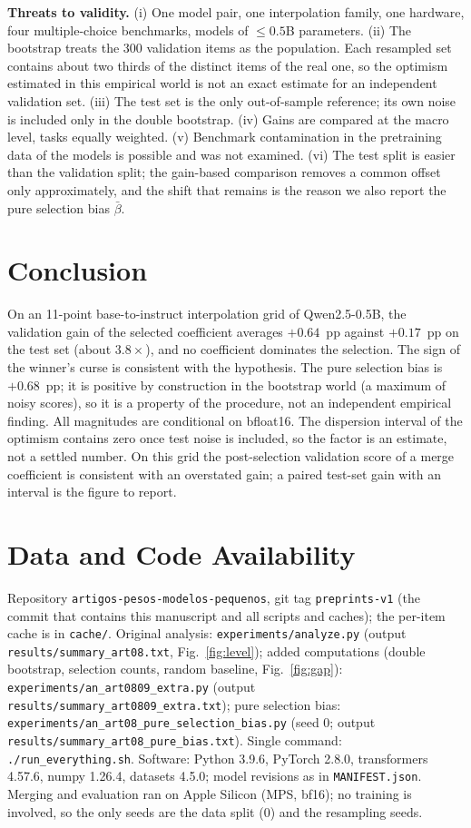 \documentclass[conference]{IEEEtran}
\begin{document}
\textbf{Threats to validity.} (i) One model pair, one interpolation family, one hardware, four multiple-choice benchmarks, models of $\le0.5$B parameters. (ii) The bootstrap treats the 300 validation items as the population. Each resampled set contains about two thirds of the distinct items of the real one, so the optimism estimated in this empirical world is not an exact estimate for an independent validation set. (iii) The test set is the only out-of-sample reference; its own noise is included only in the double bootstrap. (iv) Gains are compared at the macro level, tasks equally weighted. (v) Benchmark contamination in the pretraining data of the models is possible and was not examined. (vi) The test split is easier than the validation split; the gain-based comparison removes a common offset only approximately, and the shift that remains is the reason we also report the pure selection bias $\bar\beta$.

\section{Conclusion}
On an 11-point base-to-instruct interpolation grid of Qwen2.5-0.5B, the validation gain of the selected coefficient averages $+0.64$~pp against $+0.17$~pp on the test set (about $3.8\times$), and no coefficient dominates the selection. The sign of the winner's curse is consistent with the hypothesis. The pure selection bias is $+0.68$~pp; it is positive by construction in the bootstrap world (a maximum of noisy scores), so it is a property of the procedure, not an independent empirical finding. All magnitudes are conditional on bfloat16. The dispersion interval of the optimism contains zero once test noise is included, so the factor is an estimate, not a settled number. On this grid the post-selection validation score of a merge coefficient is consistent with an overstated gain; a paired test-set gain with an interval is the figure to report.

\section*{Data and Code Availability}
Repository \texttt{artigos-pesos-modelos-pequenos}, git tag \texttt{preprints-v1} (the commit that contains this manuscript and all scripts and caches); the per-item cache is in \texttt{cache/}. Original analysis: \texttt{experiments/analyze.py} (output \texttt{results/summary\_art08.txt}, Fig.~\ref{fig:level}); added computations (double bootstrap, selection counts, random baseline, Fig.~\ref{fig:gap}): \texttt{experiments/an\_art0809\_extra.py} (output \texttt{results/summary\_art0809\_extra.txt}); pure selection bias: \texttt{experiments/an\_art08\_pure\_selection\_bias.py} (seed 0; output \texttt{results/summary\_art08\_pure\_bias.txt}). Single command: \texttt{./run\_everything.sh}. Software: Python 3.9.6, PyTorch 2.8.0, transformers 4.57.6, numpy 1.26.4, datasets 4.5.0; model revisions as in \texttt{MANIFEST.json}. Merging and evaluation ran on Apple Silicon (MPS, bf16); no training is involved, so the only seeds are the data split (0) and the resampling seeds.
\end{document}
